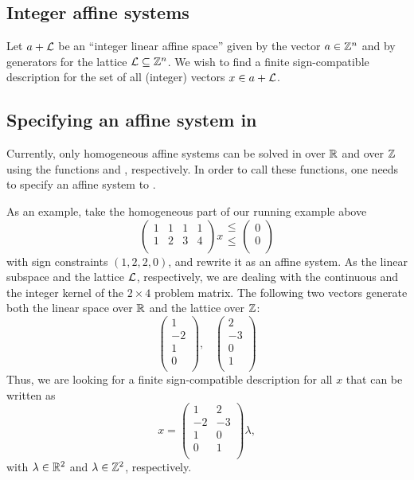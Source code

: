 \subsection{Integer affine systems}

Let $a+\mathcal{L}$ be an ``integer linear affine space'' given by the
vector $a\in\mathbb Z^n$ and by generators for the lattice
$\mathcal{L}\subseteq\mathbb Z^n$. We wish to find a finite sign-compatible
description for the set of all (integer) vectors $x\in a+\mathcal{L}$.

\subsection{Specifying an affine system in \FourTiTwo{}}

Currently, only homogeneous affine systems can be solved in
\FourTiTwo{} over $\mathbb R$ and over $\mathbb Z$ using the functions
 and , respectively. In order to call
these functions, one needs to specify an affine system to
\FourTiTwo.

As an example, take the homogeneous part of our running example
above
\[
\left(
\begin{array}{cccc}
1 & 1 & 1 & 1\\
1 & 2 & 3 & 4\\
\end{array}
\right)x
\begin{array}{c}
\leq\\
\leq\\
\end{array}
\left(
\begin{array}{c}
0\\
0\\
\end{array}
\right)
\]
with sign constraints $(1,2,2,0)$, and rewrite it as an affine
system. As the linear subspace and the lattice $\mathcal{L}$,
respectively, we are dealing with the continuous and the integer
kernel of the $2\times 4$ problem matrix. The following two vectors
generate both the linear space over $\mathbb R$ and the lattice over $\mathbb Z$:
\[
\left(
\begin{array}{r}
1\\
-2\\
1\\
0\\
\end{array}
\right),\;\;\; \left(
\begin{array}{r}
2\\
-3\\
0\\
1\\
\end{array}
\right)
\]
Thus, we are looking for a finite sign-compatible description for
all $x$ that can be written as
\[
x=\left(
\begin{array}{rr}
1 & 2\\
-2 & -3\\
1 & 0\\
0 & 1\\
\end{array}
\right)\lambda,
\]
with $\lambda\in\mathbb R^2$ and $\lambda\in\mathbb Z^2$, respectively.

